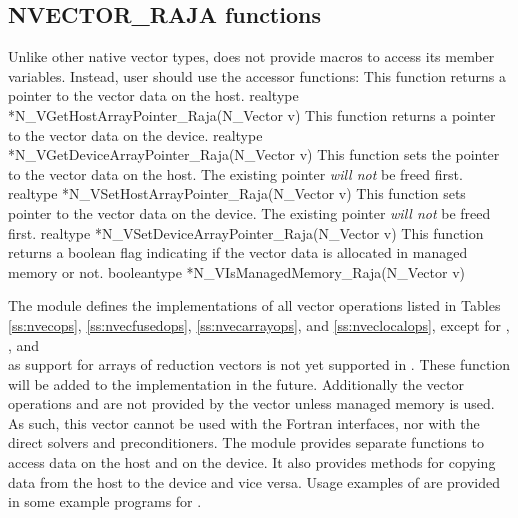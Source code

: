 \subsection{NVECTOR\_RAJA functions}
\label{ss:nvec_raja_functions}

Unlike other native {\sundials} vector types, {\nvecraja} does not provide macros
to access its member variables. Instead, user should use the accessor functions:
{
  This function returns a pointer to the vector data on the host.
}
{
  realtype *N\_VGetHostArrayPointer\_Raja(N\_Vector v)
}
{
  This function returns a pointer to the vector data on the device.
}
{
  realtype *N\_VGetDeviceArrayPointer\_Raja(N\_Vector v)
}
{
  This function sets the pointer to the vector data on the host.
  The existing pointer \textit{will not} be freed first.
}
{
  realtype *N\_VSetHostArrayPointer\_Raja(N\_Vector v)
}
{
  This function sets pointer to the vector data on the device.
  The existing pointer \textit{will not} be freed first.
}
{
  realtype *N\_VSetDeviceArrayPointer\_Raja(N\_Vector v)
}
{
  This function returns a boolean flag indicating if the vector
  data is allocated in managed memory or not.
}
{
  booleantype *N\_VIsManagedMemory\_Raja(N\_Vector v)
}

The {\nvecraja} module defines the implementations of all vector operations listed
in Tables \ref{ss:nvecops}, \ref{ss:nvecfusedops}, \ref{ss:nvecarrayops},
and \ref{ss:nveclocalops}, except
for , , and \\ \noindent
{} as support for arrays of reduction vectors is not
yet supported in {\raja}. These function will be added to the {\nvecraja}
implementation in the future. Additionally the vector operations
 and  are not provided by the
{\raja} vector unless managed memory is used.
As such, this vector cannot be used with the {\sundials} Fortran interfaces,
nor with the {\sundials} direct solvers and preconditioners.
The {\nvecraja} module provides separate functions to access data on the host
and on the device. It also provides methods for copying data from the host to
the device and vice versa. Usage examples of {\nvecraja} are provided in
some example programs for {\cvode} \cite{cvode_ex}.

